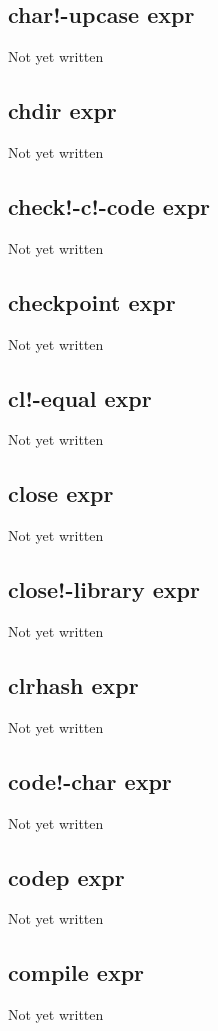 \documentclass[a4paper,11pt]{article}
\begin{document}
\subsection{\ttfamily char!-upcase expr}
Not yet written

\subsection{\ttfamily chdir expr}
Not yet written

\subsection{\ttfamily check!-c!-code expr}
Not yet written

\subsection{\ttfamily checkpoint expr}
Not yet written

\subsection{\ttfamily cl!-equal expr}
Not yet written

\subsection{\ttfamily close expr}
Not yet written

\subsection{\ttfamily close!-library expr}
Not yet written

\subsection{\ttfamily clrhash expr}
Not yet written

\subsection{\ttfamily code!-char expr}
Not yet written

\subsection{\ttfamily codep expr}
Not yet written

\subsection{\ttfamily compile expr}
Not yet written
\end{document}
